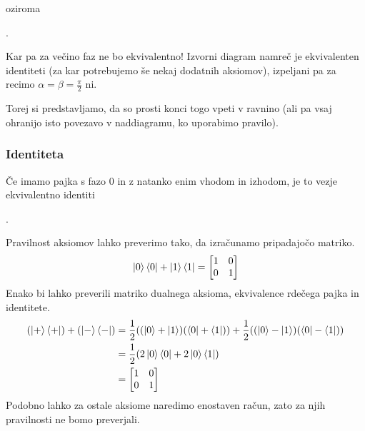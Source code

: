 \documentclass[mat1]{fmfdelo}
\begin{document}
oziroma 
\begin{center}
    .
\end{center}
Kar pa za večino faz ne bo ekvivalentno! Izvorni diagram namreč je ekvivalenten identiteti (za kar potrebujemo še nekaj dodatnih aksiomov), izpeljani pa za recimo \(\alpha = \beta = \frac\pi2\) ni.

Torej si predstavljamo, da so prosti konci togo vpeti v ravnino (ali pa vsaj ohranijo isto povezavo v naddiagramu, ko uporabimo pravilo).
\subsubsection{Identiteta} \label{identiteta}
Če imamo pajka s fazo \(0\) in z natanko enim vhodom in izhodom, je to vezje ekvivalentno identiti
\begin{center}
    .
\end{center}
Pravilnost aksiomov lahko preverimo tako, da izračunamo pripadajočo matriko.
\begin{align*}
    \ket0\bra0 + \ket1\bra1 = \begin{bmatrix}
        1&0\\0&1
    \end{bmatrix}
\end{align*}
Enako bi lahko preverili matriko dualnega aksioma, ekvivalence rdečega pajka in identitete.
\begin{align*}
    (\ket+\bra+) +(\ket-\bra-)&=
    \frac{1}{2} ((\ket0+\ket1)(\bra0 + \bra1)) + \frac{1}{2}((\ket0-\ket1)(\bra0 - \bra1))\\
    &=\frac{1}{2} (2\ket0\bra0 + 2\ket0\bra1)\\
    &=\begin{bmatrix}
        1&0\\0&1
    \end{bmatrix}
\end{align*}
Podobno lahko za ostale aksiome naredimo enostaven račun, zato za njih pravilnosti ne bomo preverjali.
\end{document}
